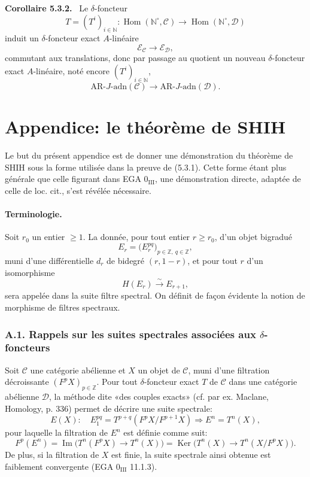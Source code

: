 \documentclass[11pt]{article}
\newenvironment{statement}[1]{\par\medskip\noindent\textbf{#1.}\ }{\par\medskip}
\DeclareMathOperator{\Hom}{Hom}
\providecommand{\Ker}{\operatorname{Ker}}
\providecommand{\Hom}{\operatorname{Hom}}
\providecommand{\Im}{\operatorname{Im}}
\providecommand{\Ker}{\operatorname{Ker}}
\renewcommand{\Im}{\operatorname{Im}}
\providecommand{\Ker}{\operatorname{Ker}}
\providecommand{\Im}{\operatorname{Im}}
\providecommand{\Hom}{\operatorname{Hom}}
\begin{document}
\begin{statement}{Corollaire 5.3.2}
Le \(\delta\)-foncteur
\[
T=(T^i)_{i\in\mathbb N}:\Hom(\mathbb N^\circ,\mathcal C)\longrightarrow\Hom(\mathbb N^\circ,\mathcal D)
\]
induit un \(\delta\)-foncteur exact \(A\)-linéaire
\[
\mathcal E_{\mathcal C}\longrightarrow\mathcal E_{\mathcal D},
\]
commutant aux translations, donc par passage au quotient un nouveau \(\delta\)-foncteur exact \(A\)-linéaire, noté encore \((T^i)_{i\in\mathbb N}\),
\[
\mathrm{AR}\text{-}J\text{-adn}(\mathcal C)\longrightarrow
\mathrm{AR}\text{-}J\text{-adn}(\mathcal D).
\]
\end{statement}

\section*{Appendice: le théorème de SHIH}

Le but du présent appendice est de donner une démonstration du théorème de SHIH sous la forme utilisée dans la preuve de (5.3.1). Cette forme étant plus générale que celle figurant dans EGA \(0_{\mathrm{III}}\), une démonstration directe, adaptée de celle de loc. cit., s'est révélée nécessaire.

\paragraph{Terminologie.}
Soit \(r_0\) un entier \(\ge1\). La donnée, pour tout entier \(r\ge r_0\), d'un objet bigradué
\[
E_r=\bigl(E_r^{pq}\bigr)_{p\in\mathbb Z,\ q\in\mathbb Z},
\]
muni d'une différentielle \(d_r\) de bidegré \((r,1-r)\), et pour tout \(r\) d'un isomorphisme
\[
H(E_r)\xrightarrow{\sim}E_{r+1},
\]
sera appelée dans la suite filtre spectral. On définit de façon évidente la notion de morphisme de filtres spectraux.

\subsubsection*{A.1. Rappels sur les suites spectrales associées aux \(\delta\)-foncteurs}

Soit \(\mathcal C\) une catégorie abélienne et \(X\) un objet de \(\mathcal C\), muni d'une filtration décroissante \((F^pX)_{p\in\mathbb Z}\). Pour tout \(\delta\)-foncteur exact \(T\) de \(\mathcal C\) dans une catégorie abélienne \(\mathcal D\), la méthode dite «des couples exacts» (cf. par ex. Maclane, Homology, p. 336) permet de décrire une suite spectrale:
\[
E(X):\quad E_1^{pq}=T^{p+q}(F^pX/F^{p+1}X)\Rightarrow E^n=T^n(X),
\]
pour laquelle la filtration de \(E^n\) est définie comme suit:
\[
F^p(E^n)=\Im\bigl(T^n(F^pX)\longrightarrow T^n(X)\bigr)
=\Ker\bigl(T^n(X)\longrightarrow T^n(X/F^pX)\bigr).
\]
De plus, si la filtration de \(X\) est finie, la suite spectrale ainsi obtenue est faiblement convergente (EGA \(0_{\mathrm{III}}\) 11.1.3).
\end{document}

